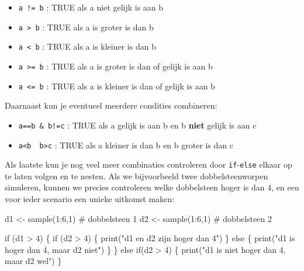 \documentclass[
  a4paper,
]{scrbook}
\newenvironment{Shaded}{\begin{snugshade}}{\end{snugshade}}
\newcommand{\CommentTok}[1]{\textcolor[rgb]{0.37,0.37,0.37}{#1}}
\newcommand{\ControlFlowTok}[1]{\textcolor[rgb]{0.00,0.23,0.31}{#1}}
\newcommand{\DecValTok}[1]{\textcolor[rgb]{0.68,0.00,0.00}{#1}}
\newcommand{\FunctionTok}[1]{\textcolor[rgb]{0.28,0.35,0.67}{#1}}
\newcommand{\NormalTok}[1]{\textcolor[rgb]{0.00,0.23,0.31}{#1}}
\newcommand{\OtherTok}[1]{\textcolor[rgb]{0.00,0.23,0.31}{#1}}
\newcommand{\SpecialCharTok}[1]{\textcolor[rgb]{0.37,0.37,0.37}{#1}}
\newcommand{\StringTok}[1]{\textcolor[rgb]{0.13,0.47,0.30}{#1}}
\theoremstyle{definition}
\theoremstyle{remark}
\begin{document}
\begin{itemize}
\item
  \texttt{a\ !=\ b} : TRUE als a niet gelijk is aan b
\item
  \texttt{a\ \textgreater{}\ b} : TRUE als a is groter is dan b
\item
  \texttt{a\ \textless{}\ b} : TRUE als a is kleiner is dan b
\item
  \texttt{a\ \textgreater{}=\ b} : TRUE als a is groter is dan of gelijk
  is aan b
\item
  \texttt{a\ \textless{}=\ b} : TRUE als a is kleiner is dan of gelijk
  is aan b
\end{itemize}

Daarnaast kun je eventueel meerdere condities combineren:

\begin{itemize}
\item
  \texttt{a==b\ \&\ b!=c} : TRUE als a gelijk is aan b en b
  \textbf{niet} gelijk is aan c
\item
  \texttt{a\textless{}b\ \textbar{}\ b\textgreater{}c} : TRUE als a
  kleiner is dan b en b groter is dan c
\end{itemize}

Als laatste kun je nog veel meer combinaties controleren door
\texttt{if}-\texttt{else} elkaar op te laten volgen en te nesten. Als we
bijvoorbeeld twee dobbelsteenworpen simuleren, kunnen we precies
controleren welke dobbelsteen hoger is dan 4, en een voor ieder scenario
een unieke uitkomst maken:

\begin{Shaded}
\begin{Highlighting}[]
\NormalTok{d1 }\OtherTok{\textless{}{-}} \FunctionTok{sample}\NormalTok{(}\DecValTok{1}\SpecialCharTok{:}\DecValTok{6}\NormalTok{,}\DecValTok{1}\NormalTok{) }\CommentTok{\# dobbelsteen 1}
\NormalTok{d2 }\OtherTok{\textless{}{-}} \FunctionTok{sample}\NormalTok{(}\DecValTok{1}\SpecialCharTok{:}\DecValTok{6}\NormalTok{,}\DecValTok{1}\NormalTok{) }\CommentTok{\# dobbelsteen 2}

\ControlFlowTok{if}\NormalTok{ (d1 }\SpecialCharTok{\textgreater{}} \DecValTok{4}\NormalTok{) \{}
  \ControlFlowTok{if}\NormalTok{ (d2 }\SpecialCharTok{\textgreater{}} \DecValTok{4}\NormalTok{) \{}
    \FunctionTok{print}\NormalTok{(}\StringTok{"d1 en d2 zijn hoger dan 4"}\NormalTok{)}
\NormalTok{  \} }\ControlFlowTok{else}\NormalTok{ \{}
    \FunctionTok{print}\NormalTok{(}\StringTok{"d1 is hoger dan 4, maar d2 niet"}\NormalTok{)}
\NormalTok{  \}}
\NormalTok{\} }\ControlFlowTok{else} \ControlFlowTok{if}\NormalTok{(d2 }\SpecialCharTok{\textgreater{}} \DecValTok{4}\NormalTok{) \{}
  \FunctionTok{print}\NormalTok{(}\StringTok{"d1 is niet hoger dan 4, maar d2 wel"}\NormalTok{)}
\NormalTok{\} }
\end{Highlighting}
\end{Shaded}
\end{document}
